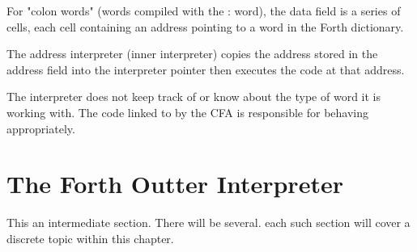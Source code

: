 For "colon words" (words compiled with the : word), the data field is a series of cells, each cell
containing an address pointing to a word in the Forth dictionary.

The address interpreter (inner interpreter) copies the address stored in the address field
into the interpreter pointer then executes the code at that address.

The interpreter does not keep track of or know about the type of word it is working with. The code linked to by the CFA is responsible for behaving appropriately.

%
\section{The Forth Outter Interpreter}
This an intermediate section. There will be several. each such section will cover a
discrete topic within this chapter.


\blindtext
